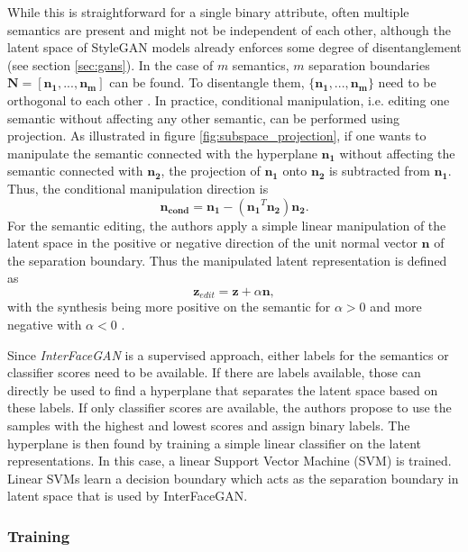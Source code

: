 While this is straightforward for a single binary attribute, often multiple semantics are present and might not be independent of each other, although the latent space of StyleGAN models already enforces some degree of disentanglement (see section \ref{sec:gans}). In the case of $m$ semantics, $m$ separation boundaries $\mathbf{N} = [\mathbf{n_1, ..., n_m}]$ can be found. To disentangle them, $\{\mathbf{n_1, ..., n_m}\}$ need to be orthogonal to each other \citep[p.4]{shen2020interpreting}. In practice, conditional manipulation, i.e. editing one semantic without affecting any other semantic, can be performed using projection. As illustrated in figure \ref{fig:subspace_projection}, if one wants to manipulate the semantic connected with the hyperplane $\mathbf{n_1}$ without affecting the semantic connected with $\mathbf{n_2}$, the projection of  $\mathbf{n_1}$ onto $\mathbf{n_2}$ is subtracted from $\mathbf{n_1}$. Thus, the conditional manipulation direction is
$$\mathbf{n_{cond}} = \mathbf{n_1} - (\mathbf{n_1}^T\mathbf{n_2})\mathbf{n_2}.$$
For the semantic editing, the authors apply a simple linear manipulation of the latent space in the positive or negative direction of the unit normal vector $\mathbf{n}$ of the separation boundary. Thus the manipulated latent representation is defined as
$$\mathbf{z}_{edit} = \mathbf{z} + \alpha\mathbf{n},$$
with the synthesis being more positive on the semantic for $\alpha >0$ and more negative with $\alpha <0$ \citep[p.4]{shen2020interpreting}.

Since \textit{InterFaceGAN} is a supervised approach, either labels for the semantics or classifier scores need to be available. If there are labels available, those can directly be used to find a hyperplane that separates the latent space based on these labels. If only classifier scores are available, the authors propose to use the samples with the highest and lowest scores and assign binary labels. The hyperplane is then found by training a simple linear classifier on the latent representations. In this case, a linear Support Vector Machine (SVM) is trained. Linear SVMs learn a decision boundary which acts as the separation boundary in latent space that is used by InterFaceGAN.

\subsubsection{Training}\label{sec:interfacegan_training}

